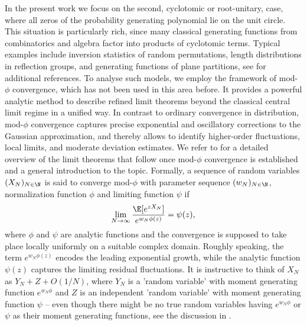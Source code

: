 \documentclass[11pt,a4paper]{scrartcl}
\numberwithin{equation}{section}
\theoremstyle{plain}
\theoremstyle{definition}
\theoremstyle{remark}
\begin{document}
In the present work we focus on the second, cyclotomic or root-unitary, case, where all zeros of the probability generating polynomial lie on the unit circle. This situation is particularly rich, since many classical generating functions from combinatorics and algebra factor into products of cyclotomic terms. Typical examples include inversion statistics of random permutations, length distributions in reflection groups, and generating functions of plane partitions, see \cite{BilleySwanson,heerten2024probabilistic,hwang2015limit,RednossThaele} for additional references. To analyse such models, we employ the framework of mod-$\phi$ convergence, which has not been used in this area before. It provides a powerful analytic method to describe refined limit theorems beyond the classical central limit regime in a unified way. In contrast to ordinary convergence in distribution, mod-$\phi$ convergence captures precise exponential and oscillatory corrections to the Gaussian approximation, and thereby allows to identify higher-order fluctuations, local limits, and moderate deviation estimates. We refer to \cite{feray2018mod} for a detailed overview of the limit theorems that follow once mod-$\phi$ convergence is established and a general introduction to the topic. Formally, a sequence of random variables $(X_N)_{N\in\N}$ is said to converge mod-$\phi$ with parameter sequence $(w_N)_{N\in\N}$, normalization function $\phi$ and limiting function $\psi$ if
$$
\lim_{N\to\infty}{\E[e^{z X_N}] \over e^{w_N \phi(z)}}  = \psi(z),
$$
where $\phi$ and $\psi$ are analytic functions and the convergence is supposed to take place locally uniformly on a suitable complex domain. Roughly speaking, the term $e^{w_N \phi(z)}$ encodes the leading exponential growth, while the analytic function $\psi(z)$ captures the limiting residual fluctuations. It is instructive to think of $X_N$ as $Y_N+Z+O(1/N)$, where $Y_N$ is a 'random variable' with moment generating function $e^{w_N\phi}$ and $Z$ is an independent 'random variable' with moment generating function $\psi$ -- even though there might be no true random variables having $e^{w_N\phi}$ or $\psi$ as their moment generating functions, see the discussion in \cite{kabluchko2024mod}.
\end{document}
